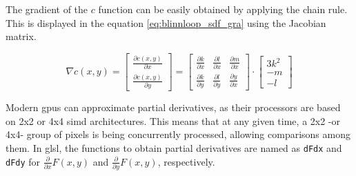 \documentclass[\topdir/main.tex]{subfiles}
\begin{document}
The gradient of the $c$ function can be easily obtained by applying the chain rule. This is displayed in the equation \eqref{eq:blinnloop_sdf_gra} using the Jacobian matrix.

\begin{equation} \label{eq:blinnloop_sdf_gra}
    \nabla c(x, y) = 
    \begin{bmatrix}
        \frac{\partial c(x, y)}{\partial x} \\
        \frac{\partial c(x, y)}{\partial y}
    \end{bmatrix}
    =
    \begin{bmatrix}
        \frac{\partial k}{\partial x} & \frac{\partial l}{\partial x} & \frac{\partial m}{\partial x} \\
        \frac{\partial k}{\partial y} & \frac{\partial l}{\partial y} & \frac{\partial y}{\partial x}
    \end{bmatrix}
    \cdot
    \begin{bmatrix}
        3 k^2 \\
        -m \\
        -l
    \end{bmatrix}
\end{equation}

Modern \glspl{gpu} can approximate partial derivatives, as their processors are based on 2x2 or 4x4 \gls{simd} architectures. This means that at any given time, a 2x2 -or 4x4- group of pixels is being concurrently processed, allowing comparisons among them. In \gls{glsl}, the functions to obtain partial derivatives are named as \texttt{dFdx} and \texttt{dFdy} for $\frac{\partial}{\partial x}F(x, y)$ and $\frac{\partial}{\partial y}F(x, y)$, respectively.\newline

\printbibliography
\end{document}
